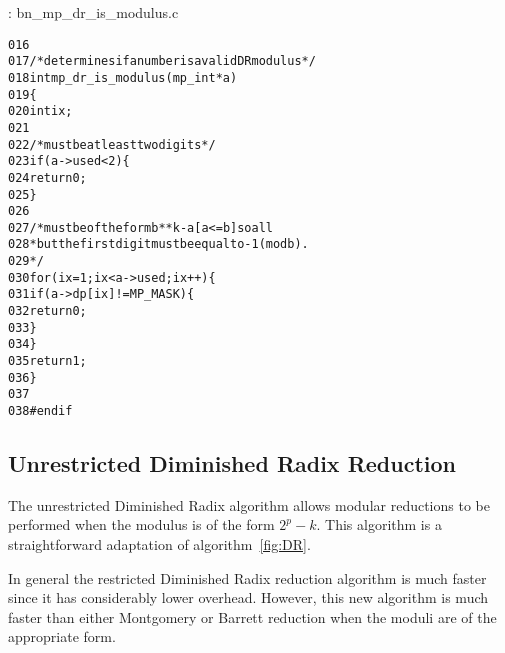 \documentclass[b5paper]{book}
\begin{document}
\vspace{+3mm}\begin{small}
\hspace{-5.1mm}{\bf File}: bn\_mp\_dr\_is\_modulus.c
\vspace{-3mm}
\begin{alltt}
016   
017   /* determines if a number is a valid DR modulus */
018   int mp_dr_is_modulus(mp_int *a)
019   \{
020      int ix;
021   
022      /* must be at least two digits */
023      if (a->used < 2) \{
024         return 0;
025      \}
026   
027      /* must be of the form b**k - a [a <= b] so all
028       * but the first digit must be equal to -1 (mod b).
029       */
030      for (ix = 1; ix < a->used; ix++) \{
031          if (a->dp[ix] != MP_MASK) \{
032             return 0;
033          \}
034      \}
035      return 1;
036   \}
037   
038   #endif
\end{alltt}
\end{small}

\subsection{Unrestricted Diminished Radix Reduction}
The unrestricted Diminished Radix algorithm allows modular reductions to be performed when the modulus is of the form $2^p - k$.  This algorithm
is a straightforward adaptation of algorithm~\ref{fig:DR}.

In general the restricted Diminished Radix reduction algorithm is much faster since it has considerably lower overhead.  However, this new
algorithm is much faster than either Montgomery or Barrett reduction when the moduli are of the appropriate form.
\end{document}
